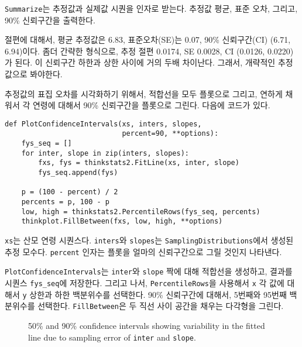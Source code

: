 {\tt Summarize}는 추정값과 실제값 시퀀을 인자로 받는다. 추정값 평균, 표준 오차, 그리고, 90\% 신뢰구간을 출력한다.

절편에 대해서, 평균 추정값은 6.83, 표준오차(SE)는 0.07, 90\% 신뢰구간(CI) (6.71, 6.94)이다. 좀더 간략한 형식으로, 추정 절편 0.0174, SE 0.0028, CI (0.0126, 0.0220)가 된다. 이 신뢰구간 하한과 상한 사이에 거의 두배 차이난다. 그래서, 개략적인 추정값으로 봐야한다.


추정값의 표집 오차를 시각화하기 위해서, 적합선을 모두 플롯으로 그리고, 연하게 채워서 각 연령에 대해서 90\% 신뢰구간을 플롯으로 그린다. 다음에 코드가 있다.

\begin{verbatim}
def PlotConfidenceIntervals(xs, inters, slopes,
                            percent=90, **options):
    fys_seq = []
    for inter, slope in zip(inters, slopes):
        fxs, fys = thinkstats2.FitLine(xs, inter, slope)
        fys_seq.append(fys)

    p = (100 - percent) / 2
    percents = p, 100 - p
    low, high = thinkstats2.PercentileRows(fys_seq, percents)
    thinkplot.FillBetween(fxs, low, high, **options)
\end{verbatim}

{\tt xs}는 산모 연령 시퀀스다. {\tt inters}와 {\tt slopes}는 {\tt SamplingDistributions}에서 생성된 추정 모수다. {\tt percent} 인자는 플롯을 얼마의 신뢰구간으로 그릴 것인지 나타낸다.

{\tt PlotConfidenceIntervals}는 {\tt inter}와 {\tt slope} 짝에 대해 적합선을 생성하고, 결과를 시퀀스 \verb"fys_seq"에 저장한다.
그리고 나서, {\tt PercentileRows}을 사용해서 {\tt x} 각 값에 대해서 {\tt y} 상한과 하한 백분위수를 선택한다. 
90\% 신뢰구간에 대해서, 5번째와 95번째 백분위수를 선택한다. 
{\tt FillBetween}은 두 직선 사이 공간을 채우는 다각형을 그린다.

\begin{figure}
\caption{50\% and 90\% confidence intervals showing variability in the
  fitted line due to sampling error of {\tt inter} and {\tt slope}.}
\label{linear3}
\end{figure}

